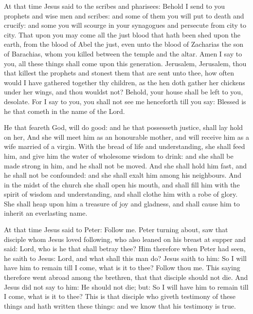 At that time Jesus said to the scribes and pharisees: Behold I send to you prophets and wise men and scribes:
and some of them you will put to death and crucify: and some you will
scourge in your synagogues and persecute from city to city.
That upon you may come all the just blood that hath been shed
upon the earth, from the blood of Abel the just, even unto the blood of
Zacharias the son of Barachias, whom you killed between the temple and
the altar.
Amen I say to you, all these things shall come upon this
generation.
Jerusalem, Jerusalem, thou that killest the prophets and stonest
them that are sent unto thee, how often would I have gathered together
thy children, as the hen doth gather her chickens under her wings, and
thou wouldst not?
Behold, your house shall be left to you, desolate.
For I say to you, you shall not see me henceforth till you say:
Blessed is he that cometh in the name of the Lord.






He that feareth God, will do good: and he that possesseth justice,
shall lay hold on her,
And she will meet him as an honourable mother, and will receive
him as a wife married of a virgin.
With the bread of life and understanding, she shall feed him, and
give him the water of wholesome wisdom to drink: and she shall be made
strong in him, and he shall not be moved.
And she shall hold him fast, and he shall not be confounded: and
she shall exalt him among his neighbours.
And in the midst of the church she shall open his mouth, and shall
fill him with the spirit of wisdom and understanding, and shall clothe
him with a robe of glory.
She shall heap upon him a treasure of joy and gladness, and shall
cause him to inherit an everlasting name.


At that time Jesus said to Peter: Follow me.
Peter turning about, saw that disciple whom Jesus loved
following, who also leaned on his breast at supper and said: Lord, who
is he that shall betray thee?
Him therefore when Peter had seen, he saith to Jesus: Lord, and
what shall this man do?
Jesus saith to him: So I will have him to remain till I come,
what is it to thee? Follow thou me.
This saying therefore went abroad among the brethren, that that
disciple should not die. And Jesus did not say to him: He should not
die; but: So I will have him to remain till I come, what is it to thee?
This is that disciple who giveth testimony of these things and
hath written these things: and we know that his testimony is true.



